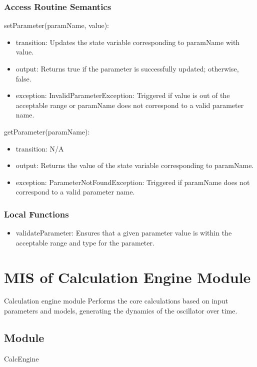 \documentclass[12pt, titlepage]{article}
\begin{document}
\subsubsection{Access Routine Semantics}

\noindent setParameter(paramName, value):
\begin{itemize}
\item transition: Updates the state variable corresponding to paramName with value.
\item output: Returns true if the parameter is successfully updated; otherwise, false.
\item exception: InvalidParameterException: Triggered if value is out of the acceptable range or paramName does not correspond to a valid parameter name.
\end{itemize}

\noindent getParameter(paramName):
\begin{itemize}
\item transition: N/A
\item output: Returns the value of the state variable corresponding to paramName.
\item exception: ParameterNotFoundException: Triggered if paramName does not correspond to a valid parameter name.
\end{itemize}

\subsubsection{Local Functions}

\begin{itemize}
  \item validateParameter: Ensures that a given parameter value is within the acceptable range and type for the parameter.
\end{itemize}



\section{MIS of Calculation Engine Module} \label{mCE}

Calculation engine module Performs the core calculations based on input parameters and models, generating
the dynamics of the oscillator over time.

\subsection{Module}
CalcEngine
\end{document}
